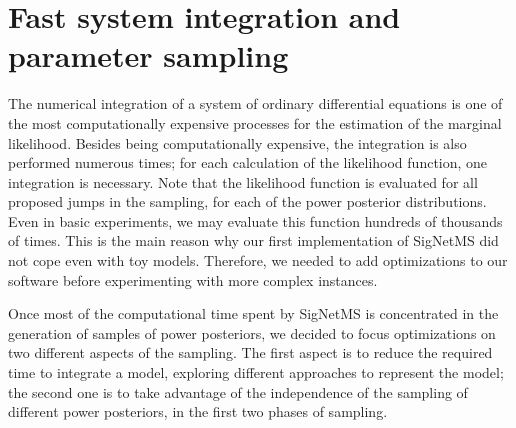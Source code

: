 \section{Fast system integration and parameter sampling}
%   
The numerical integration of a system of ordinary differential equations
is one of the most computationally expensive processes for the
estimation of the marginal likelihood. Besides being computationally
expensive, the integration is also performed numerous times; for each
calculation of the likelihood function, one integration is necessary.
Note that the likelihood function is evaluated for all proposed jumps in
the sampling, for each of the power posterior distributions. Even in
basic experiments, we may evaluate this function hundreds of thousands
of times. This is the main reason why our first implementation of 
SigNetMS did not cope even with toy models. Therefore, we needed to add
optimizations to our software before experimenting with more complex
instances.

Once most of the computational time spent by SigNetMS is concentrated
in the generation of samples of power posteriors, we decided to focus
optimizations on two different aspects of the sampling. The first aspect is to reduce the required time to integrate a model, exploring
different approaches to represent the model; the second one is to
take advantage of the independence of the sampling of different
power posteriors, in the first two phases of sampling.


